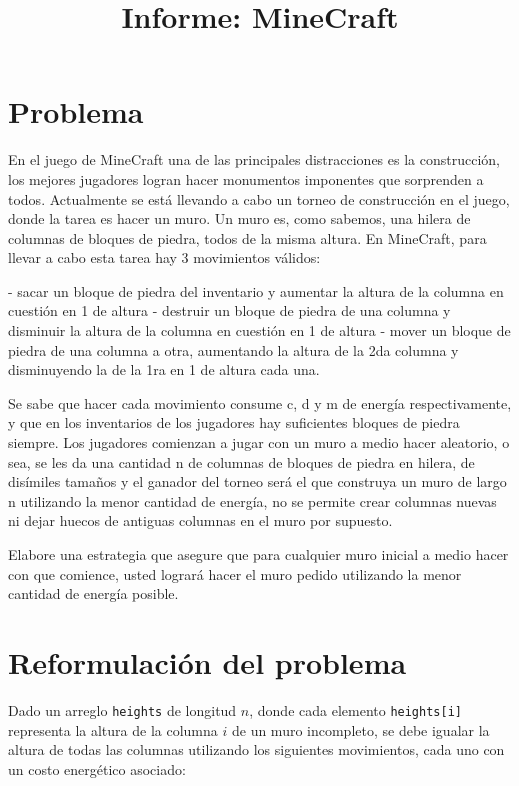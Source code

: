 \documentclass[a4paper,12pt]{article}
\title{Informe: MineCraft}
\date{}
\begin{document}
\maketitle

\tableofcontents

\section{Problema}

En el juego de MineCraft una de las principales distracciones es la construcción, los mejores jugadores logran hacer monumentos imponentes que sorprenden a todos. Actualmente se está llevando a cabo un torneo de construcción en el juego, donde la tarea es hacer un muro. Un muro es, como sabemos, una hilera de columnas de bloques de piedra, todos de la misma altura. En MineCraft, para llevar a cabo esta tarea hay 3 movimientos válidos: 

- sacar un bloque de piedra del inventario y aumentar la altura de la columna en cuestión en 1 de altura 
- destruir un bloque de piedra de una columna y disminuir la altura de la columna en cuestión en 1 de altura 
- mover un bloque de piedra de una columna a otra, aumentando la altura de la 2da columna y disminuyendo la de la 1ra en 1 de altura cada una.

Se sabe que hacer cada movimiento consume c, d y m de energía respectivamente, y que en los inventarios de los jugadores hay suficientes bloques de piedra siempre. Los jugadores comienzan a jugar con un muro a medio hacer aleatorio, o sea, se les da una cantidad n de columnas de bloques de piedra en hilera, de disímiles tamaños y el ganador del torneo será el que construya un muro de largo n utilizando la menor cantidad de energía, no se permite crear columnas nuevas ni dejar huecos de antiguas columnas en el muro por supuesto. 

Elabore una estrategia que asegure que para cualquier muro inicial a medio hacer con que comience, usted logrará hacer el muro pedido utilizando la menor cantidad de energía posible.


\section{Reformulación del problema}

Dado un arreglo \texttt{heights} de longitud $n$, donde cada elemento \texttt{heights[i]} representa la altura de la columna $i$ de un muro incompleto, se debe igualar la altura de todas las columnas utilizando los siguientes movimientos, cada uno con un costo energético asociado:
\end{document}
